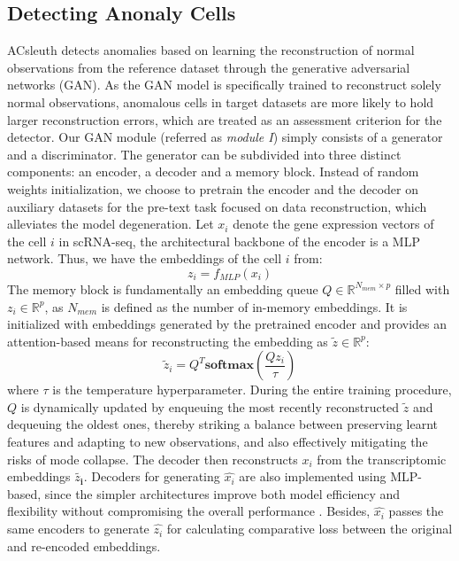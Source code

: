 \documentclass{article}
\begin{document}
\subsection{Detecting Anonaly Cells}
ACsleuth detects anomalies based on learning the reconstruction of normal 
observations from the reference dataset through the generative adversarial networks (GAN). 
As the GAN model is specifically trained to reconstruct solely normal observations, 
anomalous cells in target datasets are more likely to hold larger reconstruction errors, 
which are treated as an assessment criterion for the detector.
Our GAN module (referred as \textit{module I}) simply consists of a generator and a discriminator. 
The generator can be subdivided into three distinct components: an encoder, a decoder and 
a memory block. Instead of random weights initialization, we choose to pretrain the encoder 
and the decoder on auxiliary datasets for the pre-text task focused on data reconstruction, 
which alleviates the model degeneration. Let $x_i$ denote the gene expression vectors of the cell 
$i$ in scRNA-seq, the architectural backbone of the encoder is a MLP network. Thus, we have 
the embeddings of the cell $i$ from:
\begin{equation}
    z_i = f_{\textit{MLP}}(x_i)
\end{equation}
The memory block is fundamentally an embedding queue $Q\in\mathbb{R}^{N_{mem}\times p}$ 
filled with $z_i\in\mathbb{R}^p$, as $N_{mem}$ is defined as the number of in-memory 
embeddings. It is initialized with embeddings generated by the pretrained encoder and 
provides an attention-based 
means for reconstructing the embedding as $\widetilde{z} \in \mathbb{R}^p$: 
\begin{equation}
    \widetilde{z}_i = Q^T \mathbf{softmax}\left(\frac{Qz_i}{\tau}\right)
\end{equation}
where $\tau$ is the temperature hyperparameter. During the entire training procedure,  
$Q$ is dynamically updated by enqueuing the most recently 
reconstructed $\widetilde{z}$ and dequeuing the oldest ones, thereby striking 
a balance between preserving learnt features and adapting to new observations, and also 
effectively mitigating the risks of mode collapse. The decoder then reconstructs $x_i$ from 
the transcriptomic embeddings $\widetilde{z_\mathbf{i}}$. Decoders for 
generating $\widehat{x_i}$ are also implemented using MLP-based, since the simpler 
architectures improve both model efficiency and flexibility without compromising the 
overall performance \cite{AGC}. Besides, $\widehat{x_i}$ passes the same encoders 
to generate $\widehat{z_i}$ for calculating comparative loss between the original and re-encoded embeddings.
\end{document}
